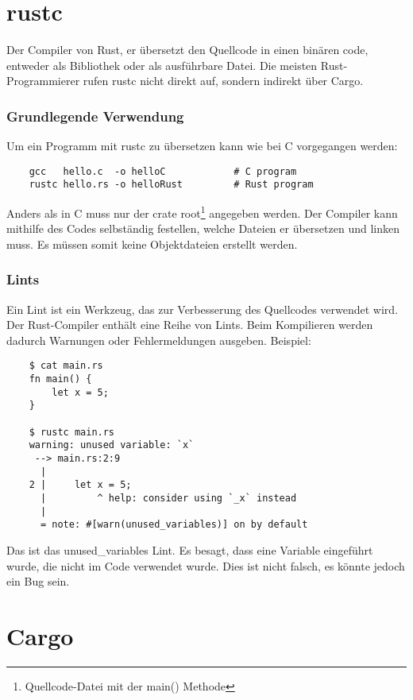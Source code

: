 \section{rustc}

Der Compiler von Rust, er übersetzt den Quellcode in einen binären code, entweder als Bibliothek oder als ausführbare Datei. Die meisten Rust-Programmierer rufen rustc nicht direkt auf, sondern indirekt über Cargo.

\subsubsection{Grundlegende Verwendung}

Um ein Programm mit rustc zu übersetzen kann wie bei C vorgegangen werden:

\begin{lstlisting}
    gcc   hello.c  -o helloC            # C program
    rustc hello.rs -o helloRust         # Rust program
\end{lstlisting}

Anders als in C muss nur der crate root\footnote{Quellcode-Datei mit der main() Methode} angegeben werden. Der Compiler kann mithilfe des Codes selbständig festellen, welche Dateien er übersetzen und linken muss. Es müssen somit keine Objektdateien erstellt werden.

\subsubsection{Lints}

Ein \glqq Lint\grqq{} ist ein Werkzeug, das zur Verbesserung des Quellcodes verwendet wird. Der Rust-Compiler enthält eine Reihe von Lints. Beim Kompilieren werden dadurch Warnungen oder Fehlermeldungen ausgeben. Beispiel:

\begin{lstlisting}
    $ cat main.rs
    fn main() {
        let x = 5;
    }

    $ rustc main.rs
    warning: unused variable: `x`
     --> main.rs:2:9
      |
    2 |     let x = 5;
      |         ^ help: consider using `_x` instead
      |
      = note: #[warn(unused_variables)] on by default
\end{lstlisting}

Das ist das \glqq unused\_variables\grqq{} Lint. Es besagt, dass eine Variable eingeführt wurde, die nicht im Code verwendet wurde. Dies ist nicht falsch, es könnte jedoch ein Bug sein.


\section{Cargo}

